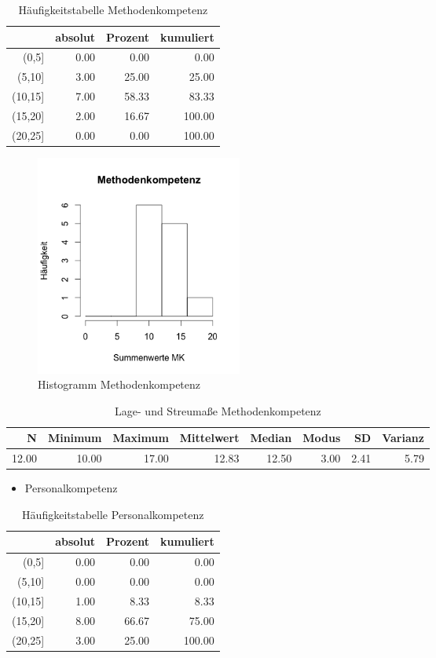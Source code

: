 \documentclass[12pt, bibliography=totoc]{scrartcl}
\begin{document}
\begin{table}[H]
\centering
\caption{Häufigkeitstabelle Methodenkompetenz}
\begin{tabular}{rrrr}
  \hline
 & absolut & Prozent & kumuliert \\
  \hline
(0,5] & 0.00 & 0.00 & 0.00 \\
  (5,10] & 3.00 & 25.00 & 25.00 \\
  (10,15] & 7.00 & 58.33 & 83.33 \\
  (15,20] & 2.00 & 16.67 & 100.00 \\
  (20,25] & 0.00 & 0.00 & 100.00 \\
   \hline
\end{tabular}
\end{table}\begin{figure}[H]
\centering
\caption{Histogramm Methodenkompetenz}
\includegraphics[width=0.33\textwidth]{Anhang/MKHist.png}
\end{figure}

\begin{table}[H]
\centering
\caption{Lage- und Streumaße Methodenkompetenz}
\begin{tabular}{rrrrrrrr}
  \hline
  N & Minimum & Maximum & Mittelwert & Median & Modus & SD & Varianz \\
  \hline
  12.00 & 10.00 & 17.00 & 12.83 & 12.50 & 3.00 & 2.41 & 5.79 \\
   \hline
\end{tabular}
\end{table}

\begin{itemize}
\tightlist
\item
  Personalkompetenz
\end{itemize}

\begin{table}[H]
\centering
\caption{Häufigkeitstabelle Personalkompetenz}
\begin{tabular}{rrrr}
  \hline
 & absolut & Prozent & kumuliert \\
  \hline
(0,5] & 0.00 & 0.00 & 0.00 \\
  (5,10] & 0.00 & 0.00 & 0.00 \\
  (10,15] & 1.00 & 8.33 & 8.33 \\
  (15,20] & 8.00 & 66.67 & 75.00 \\
  (20,25] & 3.00 & 25.00 & 100.00 \\
   \hline
\end{tabular}
\end{table}
\end{document}
